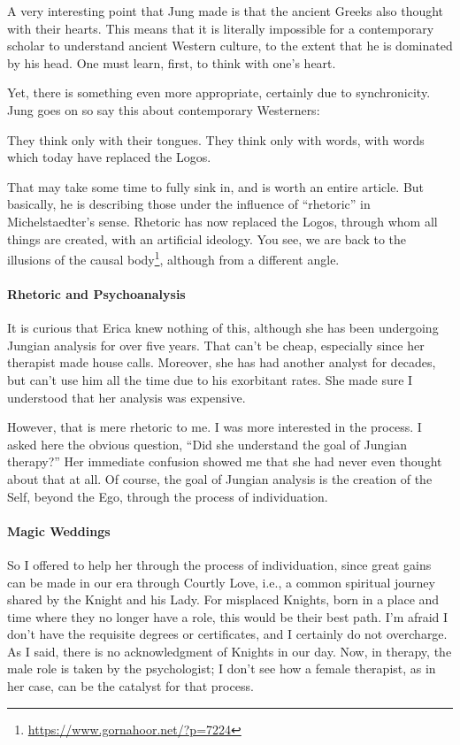 A very interesting point that Jung made is that the ancient Greeks also thought with their hearts. This means that it is literally impossible for a contemporary scholar to understand ancient Western culture, to the extent that he is dominated by his head. One must learn, first, to think with one's heart.

Yet, there is something even more appropriate, certainly due to synchronicity. Jung goes on so say this about contemporary Westerners:

\begin{quotex}
They think only with their tongues. They think only with words, with words which today have replaced the Logos. 

\end{quotex}
That may take some time to fully sink in, and is worth an entire article. But basically, he is describing those under the influence of “rhetoric” in Michelstaedter's sense. Rhetoric has now replaced the Logos, through whom all things are created, with an artificial ideology. You see, we are back to the illusions of the causal body\footnote{\url{https://www.gornahoor.net/?p=7224}}, although from a different angle.

\paragraph{Rhetoric and Psychoanalysis}
It is curious that Erica knew nothing of this, although she has been undergoing Jungian analysis for over five years. That can't be cheap, especially since her therapist made house calls. Moreover, she has had another analyst for decades, but can't use him all the time due to his exorbitant rates. She made sure I understood that her analysis was expensive.

However, that is mere rhetoric to me. I was more interested in the process. I asked here the obvious question, “Did she understand the goal of Jungian therapy?” Her immediate confusion showed me that she had never even thought about that at all. Of course, the goal of Jungian analysis is the creation of the Self, beyond the Ego, through the process of individuation.

\paragraph{Magic Weddings}
So I offered to help her through the process of individuation, since great gains can be made in our era through Courtly Love, i.e., a common spiritual journey shared by the Knight and his Lady. For misplaced Knights, born in a place and time where they no longer have a role, this would be their best path. I'm afraid I don't have the requisite degrees or certificates, and I certainly do not overcharge. As I said, there is no acknowledgment of Knights in our day. Now, in therapy, the male role is taken by the psychologist; I don't see how a female therapist, as in her case, can be the catalyst for that process.

